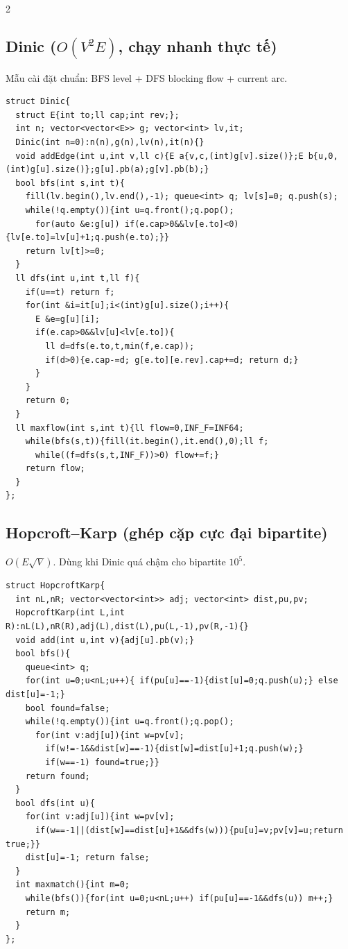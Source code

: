 \documentclass[8pt]{extarticle}
\begin{document}
\begin{multicols}{2}
\subsection{Dinic ($O(V^2E)$, chạy nhanh thực tế)}
Mẫu cài đặt chuẩn: BFS level + DFS blocking flow + current arc.
\begin{lstlisting}
struct Dinic{
  struct E{int to;ll cap;int rev;};
  int n; vector<vector<E>> g; vector<int> lv,it;
  Dinic(int n=0):n(n),g(n),lv(n),it(n){}
  void addEdge(int u,int v,ll c){E a{v,c,(int)g[v].size()};E b{u,0,(int)g[u].size()};g[u].pb(a);g[v].pb(b);}
  bool bfs(int s,int t){
    fill(lv.begin(),lv.end(),-1); queue<int> q; lv[s]=0; q.push(s);
    while(!q.empty()){int u=q.front();q.pop();
      for(auto &e:g[u]) if(e.cap>0&&lv[e.to]<0){lv[e.to]=lv[u]+1;q.push(e.to);}}
    return lv[t]>=0;
  }
  ll dfs(int u,int t,ll f){
    if(u==t) return f;
    for(int &i=it[u];i<(int)g[u].size();i++){
      E &e=g[u][i];
      if(e.cap>0&&lv[u]<lv[e.to]){
        ll d=dfs(e.to,t,min(f,e.cap));
        if(d>0){e.cap-=d; g[e.to][e.rev].cap+=d; return d;}
      }
    }
    return 0;
  }
  ll maxflow(int s,int t){ll flow=0,INF_F=INF64;
    while(bfs(s,t)){fill(it.begin(),it.end(),0);ll f;
      while((f=dfs(s,t,INF_F))>0) flow+=f;}
    return flow;
  }
};
\end{lstlisting}

\subsection{Hopcroft--Karp (ghép cặp cực đại bipartite)}
$O(E\sqrt V)$. Dùng khi Dinic quá chậm cho bipartite $10^5$.
\begin{lstlisting}
struct HopcroftKarp{
  int nL,nR; vector<vector<int>> adj; vector<int> dist,pu,pv;
  HopcroftKarp(int L,int R):nL(L),nR(R),adj(L),dist(L),pu(L,-1),pv(R,-1){}
  void add(int u,int v){adj[u].pb(v);}
  bool bfs(){
    queue<int> q;
    for(int u=0;u<nL;u++){ if(pu[u]==-1){dist[u]=0;q.push(u);} else dist[u]=-1;}
    bool found=false;
    while(!q.empty()){int u=q.front();q.pop();
      for(int v:adj[u]){int w=pv[v];
        if(w!=-1&&dist[w]==-1){dist[w]=dist[u]+1;q.push(w);}
        if(w==-1) found=true;}}
    return found;
  }
  bool dfs(int u){
    for(int v:adj[u]){int w=pv[v];
      if(w==-1||(dist[w]==dist[u]+1&&dfs(w))){pu[u]=v;pv[v]=u;return true;}}
    dist[u]=-1; return false;
  }
  int maxmatch(){int m=0;
    while(bfs()){for(int u=0;u<nL;u++) if(pu[u]==-1&&dfs(u)) m++;}
    return m;
  }
};
\end{lstlisting}


\end{multicols}
\end{document}
